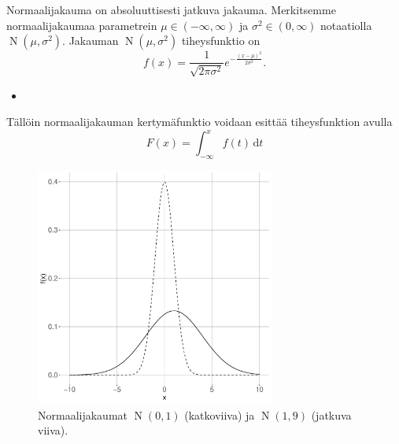 \documentclass{beamer}
\DeclareMathOperator{\n}{\mathrm N}
\begin{document}
\begin{frame}
  Normaalijakauma on absoluuttisesti jatkuva jakauma. Merkitsemme
  normaalijakaumaa parametrein $\mu\in(-\infty, \infty)$ ja
  $\sigma^2\in(0,\infty)$ notaatiolla $\n\left(\mu, \sigma^2\right)$. Jakauman
  $\n\left(\mu, \sigma^2\right)$ tiheysfunktio on
  \begin{equation*}
    f(x) = \frac{1}{\sqrt{2\pi\sigma^2}} e^{-\frac{\left(x-\mu\right)^2}
    {2\sigma^2}}.
  \end{equation*}
  \pause
  \begin{itemize}
    \item[]
  \end{itemize}
  Tällöin normaalijakauman kertymäfunktio voidaan esittää tiheysfunktion avulla
  \begin{equation*}
    F\left(x\right) = \int_{-\infty}^{x} f(t)\,\mathrm{d}t
  \end{equation*}
\end{frame}


\begin{frame}
  \begin{center}
    \begin{figure}
      \includegraphics[width=0.7\textwidth, height=0.7\textwidth]{normal}
      \caption{Normaalijakaumat $\n\left(0,1\right)$ (katkoviiva) ja $\n\left(1, 9\right)$ (jatkuva viiva).}
  \end{figure}
\end{center}
\end{frame}

\end{document}
